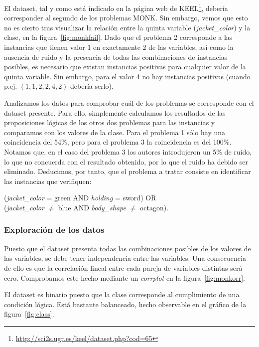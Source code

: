 \documentclass[a4paper, 11pt]{article}
\begin{document}
El dataset, tal y como está indicado en la página web de KEEL\footnote{\url{http://sci2s.ugr.es/keel/dataset.php?cod=65}}, debería corresponder al segundo de los problemas MONK. Sin embargo, vemos que esto no es cierto tras visualizar la relación entre la quinta variable (\textit{jacket\_color}) y la clase, en la figura~\ref{fig:monkfail}. Dado que el problema 2 corresponde a las instancias que tienen valor 1 en exactamente 2 de las variables, así como la ausencia de ruido y la presencia de todas las combinaciones de instancias posibles, es necesario que existan instancias positivas para cualquier valor de la quinta variable. Sin embargo, para el valor 4 no hay instancias positivas (cuando p.ej. $(1, 1, 2, 2, 4, 2)$ debería serlo).

Analizamos los datos para comprobar cuál de los problemas se corresponde con el dataset presente. Para ello, simplemente calculamos los resultados de las proposiciones lógicas de los otros dos problemas para las instancias y comparamos con los valores de la clase. Para el problema 1 sólo hay una coincidencia del 54\%, pero para el problema 3 la coincidencia es del 100\%. Notamos que, en el caso del problema 3 los autores  introdujeron un 5\% de ruido, lo que no concuerda con el resultado obtenido, por lo que el ruido ha debido ser eliminado. Deducimos, por tanto, que el problema a tratar consiste en identificar las instancias que verifiquen:
\begin{center} (\textit{jacket\_color} = green AND \textit{holding} = sword) OR \\
  (\textit{jacket\_color} $\neq$ blue AND \textit{body\_shape} $\neq$ octagon).
\end{center}

\subsubsection{Exploración de los datos}

Puesto que el dataset presenta todas las combinaciones posibles de los valores de las variables, se debe tener independencia entre las variables. Una consecuencia de ello es que la correlación lineal entre cada pareja de variables distintas será cero. Comprobamos este hecho mediante un \textit{corrplot} en la figura~\ref{fig:monkorr}.

El dataset es binario puesto que la clase corresponde al cumplimiento de una condición lógica. Está bastante balanceado, hecho observable en el gráfico de la figura~\ref{fig:class}.
\end{document}
